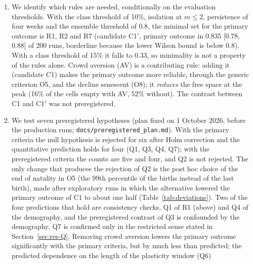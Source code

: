 \begin{enumerate}
\begin{itemize}
    claim a cascade over many generations. The ratio of the deterioration time to the generation time, measured
    on animals past the plasticity window so that newborns do not dilute it, is $\Gamma=t_{\rm det}/T_{\rm gen}$
    $\approx1.1$ (1.2 on the founders), against about 3.5 in Universe~25 with a different operational definition; it is a heuristic
    comparison of time scales, not the cause of the shallow boom. With
    initial ages spread over 4--52 or 4--80 weeks the classes, the low peak and the failure of the late cohorts
    survive, but the timing of the end of natality relative to the peak (O5) does not (item~6).
  \end{itemize}
\item We identify which rules are needed, conditionally on the evaluation thresholds.
  With the class threshold of 10\%, isolation at $m\le2$, persistence of four weeks and the ensemble threshold of 0.8,
  the minimal set for the primary outcome is R1, R2 and R7 (candidate \textsf{C1}$'$, primary outcome in
  0.835 [0.78, 0.88] of 200 runs, borderline because the lower Wilson bound is below 0.8). With a class threshold of
  15\% it falls to 0.33, so minimality is not a property of the rules alone. Crowd aversion (AV) is a contributing
  rule: adding it (candidate \textsf{C1}) makes the primary outcome more reliable, through the generic criterion
  O5, and the decline senescent (O8); it \emph{reduces} the free space at the peak (16\% of the cells empty with
  AV, 52\% without). The contrast between \textsf{C1} and \textsf{C1}$'$ was not preregistered.
\item We test seven preregistered hypotheses (plan fixed on 1 October 2026, before the production runs; \texttt{docs/preregistered\_plan.md}).
  With the primary criteria the null hypothesis is rejected for six after Holm correction and the quantitative
  prediction holds for four (Q1, Q3, Q4, Q7); with the preregistered criteria the counts are five and four, and Q2 is
  not rejected. The only change that produces the rejection of Q2 is the post hoc choice of the end of natality in
  O5 (the 99th percentile of the births instead of the last birth), made after exploratory runs in which the
  alternative lowered the primary outcome of \textsf{C1} to about one half (Table~\ref{tab:deviations}). Two of the
  four predictions that hold are consistency checks, Q1 of R1 (above) and Q4 of the demography, and the
  preregistered contrast of Q3 is confounded by the demography. Q7 is confirmed only in the restricted sense stated
  in Section~\ref{sec:res-Q}. Removing crowd aversion lowers the primary outcome significantly with the primary criteria, but by much less than predicted; the predicted dependence on the length of the plasticity window (Q6)

\end{enumerate}
